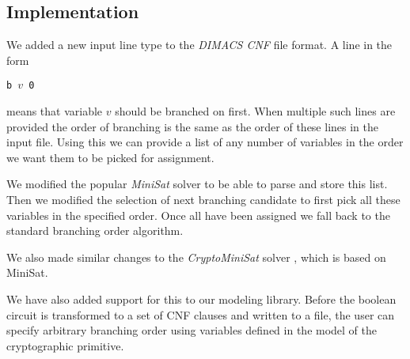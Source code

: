 \subsection{Implementation}
\label{sec:branching-order-impl}
We added a new input line type to the \emph{DIMACS CNF} file format.
A line in the form

\centerline{\texttt{b $v$ 0}}

\noindent means that variable $v$ should be branched on first.
When multiple such lines are provided the order of branching is the same as the order of these lines in the input file.
Using this we can provide a list of any number of variables in the order we want them to be picked for assignment.

We modified the popular \emph{MiniSat} solver \cite{een2005minisat} to be able to parse and store this list.
Then we modified the selection of next branching candidate to first pick all these variables in the specified order.
Once all have been assigned we fall back to the standard branching order algorithm.

We also made similar changes to the \emph{CryptoMiniSat} solver \cite{soos2009extending}, which is based on MiniSat.

We have also added support for this to our modeling library.
Before the boolean circuit is transformed to a set of CNF clauses and written to a file, the user can specify arbitrary branching order using variables defined in the model of the cryptographic primitive.